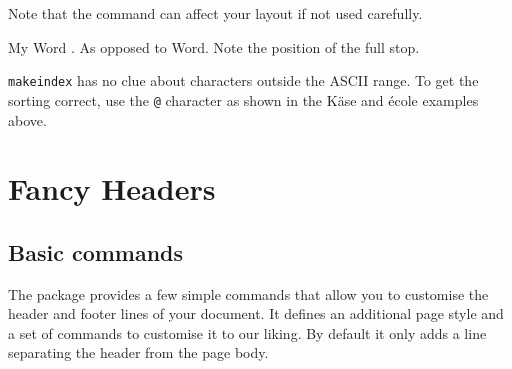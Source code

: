 Note that the  command can affect your layout if not used carefully.

\begin{chktexignore}
  \begin{example}
My Word . As opposed
to Word. Note the
position of the full stop.
\end{example}
\end{chktexignore}

\texttt{makeindex} has no clue about characters outside the ASCII range. To
get the sorting correct, use the \verb|@| character as shown in the K\"ase
and \'ecole examples above.

\section{Fancy Headers}\label{sec:fancy}

\subsection{Basic commands}

The  package provides a few simple commands that allow you to
customise the header and footer lines of your document. It defines an
additional page style  and a set of commands to customise it to our liking. By
default it only adds a line separating the header from the page body.

